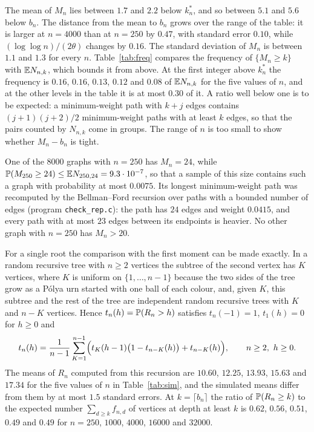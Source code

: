 The mean of $M_n$ lies between $1.7$ and $2.2$ below $k^*_n$, and so between $5.1$ and $5.6$ below $b_n$. The
distance from the mean to $b_n$ grows over the range of the table: it is larger at $n=4000$ than at $n=250$ by
$0.47$, with standard error $0.10$, while $(\log\log n)/(2\theta)$ changes by $0.16$. The standard deviation of
$M_n$ is between $1.1$ and $1.3$ for every $n$. Table~\ref{tab:freq} compares the frequency of $\{M_n\ge k\}$ with
$\mathbb{E} N_{n,k}$, which bounds it from above. At the first integer above $k^*_n$ the frequency is $0.16$, $0.16$,
$0.13$, $0.12$ and $0.08$ of $\mathbb{E} N_{n,k}$ for the five values of $n$, and at the other levels in the table it is at
most $0.30$ of it. A ratio well below one is to be expected: a minimum-weight path with $k+j$ edges contains
$(j+1)(j+2)/2$ minimum-weight paths with at least $k$ edges, so that the pairs counted by $N_{n,k}$ come in groups.
The range of $n$ is too small to show whether $M_n-b_n$ is tight.

One of the $8000$ graphs with $n=250$ has $M_n=24$, while $\mathbb{P}(M_{250}\ge24)\le\mathbb{E} N_{250,24}=9.3\cdot10^{-7}$, so
that a sample of this size contains such a graph with probability at most $0.0075$. Its longest minimum-weight path
was recomputed by the Bellman--Ford recursion over paths with a bounded number of edges (program
\texttt{check\_rep.c}): the path has $24$ edges and weight $0.0415$, and every path with at most $23$ edges between
its endpoints is heavier. No other graph with $n=250$ has $M_n>20$.

For a single root the comparison with the first moment can be made exactly. In a random recursive tree with
$n\ge2$ vertices the subtree of the second vertex has $K$ vertices, where $K$ is uniform on $\{1,\dots,n-1\}$ because
the two sides of the tree grow as a P\'olya urn started with one ball of each colour, and, given $K$, this subtree
and the rest of the tree are independent random recursive trees with $K$ and $n-K$ vertices. Hence
$t_n(h)=\mathbb{P}(R_n>h)$ satisfies $t_n(-1)=1$, $t_1(h)=0$ for $h\ge0$ and
\[
t_n(h)=\frac1{n-1}\sum_{K=1}^{n-1}\Bigl(t_K(h-1)\bigl(1-t_{n-K}(h)\bigr)+t_{n-K}(h)\Bigr),\qquad n\ge2,\ h\ge0 .
\]
The means of $R_n$ computed from this recursion are $10.60$, $12.25$, $13.93$, $15.63$ and $17.34$ for the five
values of $n$ in Table~\ref{tab:sim}, and the simulated means differ from them by at most $1.5$ standard errors. At $k=\lceil b_n\rceil$ the ratio of $\mathbb{P}(R_n\ge k)$ to the expected number
$\sum_{d\ge k}f_{n,d}$ of vertices at depth at least $k$ is $0.62$, $0.56$, $0.51$, $0.49$ and $0.49$ for
$n=250$, $1000$, $4000$, $16000$ and $32000$.
